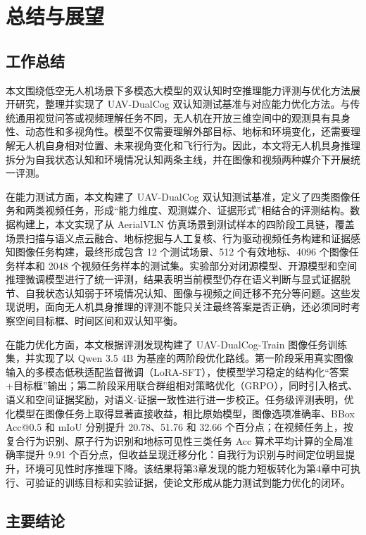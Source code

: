 
\chapter{总结与展望}

\section{工作总结}

本文围绕低空无人机场景下多模态大模型的双认知时空推理能力评测与优化方法展开研究，整理并实现了 UAV-DualCog 双认知测试基准与对应能力优化方法。与传统通用视觉问答或视频理解任务不同，无人机在开放三维空间中的观测具有具身性、动态性和多视角性。模型不仅需要理解外部目标、地标和环境变化，还需要理解无人机自身相对位置、未来视角变化和飞行行为。因此，本文将无人机具身推理拆分为自我状态认知和环境情况认知两条主线，并在图像和视频两种媒介下开展统一评测。

在能力测试方面，本文构建了 UAV-DualCog 双认知测试基准，定义了四类图像任务和两类视频任务，形成“能力维度、观测媒介、证据形式”相结合的评测结构。数据构建上，本文实现了从 AerialVLN 仿真场景到测试样本的四阶段工具链，覆盖场景扫描与语义点云融合、地标挖掘与人工复核、行为驱动视频任务构建和证据感知图像任务构建，最终形成包含 12 个测试场景、512 个有效地标、4096 个图像任务样本和 2048 个视频任务样本的测试集。实验部分对闭源模型、开源模型和空间推理微调模型进行了统一评测，结果表明当前模型仍存在语义判断与显式证据脱节、自我状态认知弱于环境情况认知、图像与视频之间迁移不充分等问题。这些发现说明，面向无人机具身推理的评测不能只关注最终答案是否正确，还必须同时考察空间目标框、时间区间和双认知平衡。

在能力优化方面，本文根据评测发现构建了 UAV-DualCog-Train 图像任务训练集，并实现了以 Qwen 3.5 4B 为基座的两阶段优化路线。第一阶段采用真实图像输入的多模态低秩适配监督微调（LoRA-SFT），使模型学习稳定的结构化“答案+目标框”输出；第二阶段采用联合群组相对策略优化（GRPO），同时引入格式、语义和空间证据奖励，对语义-证据一致性进行进一步校正。任务级评测表明，优化模型在图像任务上取得显著直接收益，相比原始模型，图像选项准确率、BBox Acc@0.5 和 mIoU 分别提升 20.78、51.76 和 32.66 个百分点；在视频任务上，按复合行为识别、原子行为识别和地标可见性三类任务 Acc 算术平均计算的全局准确率提升 9.91 个百分点，但收益呈现迁移分化：自我行为识别与时间定位明显提升，环境可见性时序推理下降。该结果将第3章发现的能力短板转化为第4章中可执行、可验证的训练目标和实验证据，使论文形成从能力测试到能力优化的闭环。

\section{主要结论}

